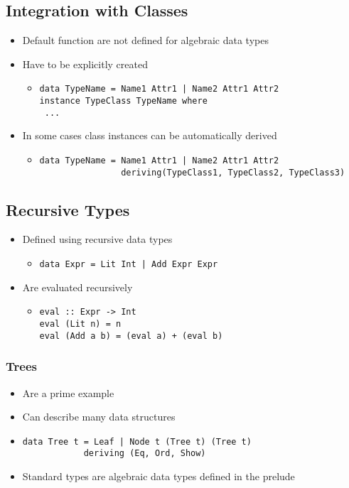 \subsection{Integration with Classes}
\begin{itemize}
    \item Default function are not defined for algebraic data types
    \item Have to be explicitly created
        \begin{itemize}
            \item
\begin{verbatim}
data TypeName = Name1 Attr1 | Name2 Attr1 Attr2
instance TypeClass TypeName where
 ...
\end{verbatim}
        \end{itemize}
    \item In some cases class instances can be automatically derived
        \begin{itemize}
            \item 
\begin{verbatim}
data TypeName = Name1 Attr1 | Name2 Attr1 Attr2
                deriving(TypeClass1, TypeClass2, TypeClass3)
\end{verbatim}
        \end{itemize}
\end{itemize}

\subsection{Recursive Types}
\begin{itemize}
    \item Defined using recursive data types
        \begin{itemize}
            \item \verb+data Expr = Lit Int | Add Expr Expr+
        \end{itemize}
    \item Are evaluated recursively
        \begin{itemize}
            \item
\begin{verbatim}
eval :: Expr -> Int
eval (Lit n) = n
eval (Add a b) = (eval a) + (eval b)
\end{verbatim}
        \end{itemize}
\end{itemize}

\subsubsection{Trees}
\begin{itemize}
    \item Are a prime example
    \item Can describe many data structures
    \item
\begin{verbatim}
data Tree t = Leaf | Node t (Tree t) (Tree t)
            deriving (Eq, Ord, Show)
\end{verbatim}
    \item Standard types are algebraic data types defined in the prelude
\end{itemize}

